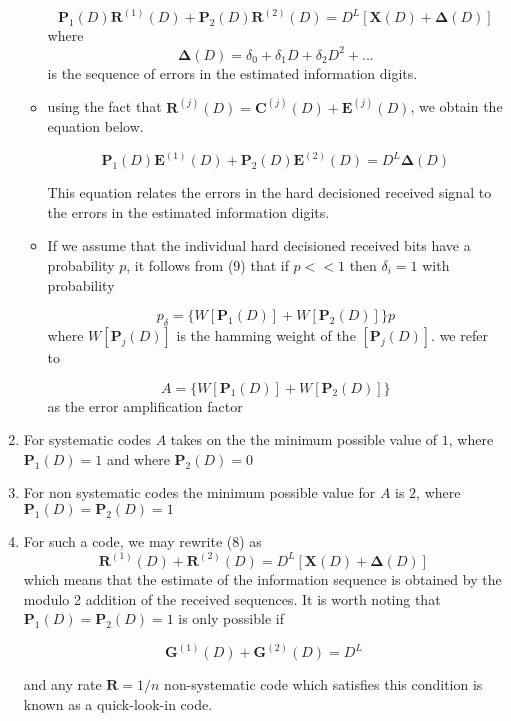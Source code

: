 \documentclass[fontsize=12pt]{article}
\begin{document}
\begin{enumerate}
\begin{itemize}
\begin{equation}
\mathbf{P}_1(D)\mathbf{R}^{(1)}(D) +\mathbf{P}_2(D)\mathbf{R}^{(2)}(D)= D^L[\mathbf{X}(D)+\mathbf{\Delta}(D)]
\end{equation}
where $$\mathbf{\Delta}(D)=\delta_0 +\delta_1D + \delta_2D^2+...$$ is the sequence of errors in the estimated information digits.

\item using the fact that $\mathbf{\mathbf{R}}^{(j)}(D)=\mathbf{C}^{(j)}(D)+\mathbf{\mathbf{E}}^{(j)}(D)$, we obtain the equation below.

\begin{equation}
\mathbf{P}_1(D)\mathbf{E}^{(1)}(D) +\mathbf{P}_2(D)\mathbf{E}^{(2)}(D)= D^L\mathbf{\Delta}(D)
\end{equation}

This equation relates the errors in the hard decisioned received signal to the errors in the estimated information digits.

\item If we assume that the individual hard decisioned received bits have a probability $p$, it follows from (9) that  if $p<<1$ then $\delta_i=1$ with probability 

\begin{equation}
p_{\delta} = \{W[\mathbf{P}_1(D)]+W[\mathbf{P}_2(D)]\}p
\end{equation}
where $W[\mathbf{P}_j(D)]$ is the hamming weight of the $[\mathbf{P}_j(D)]$. we refer to 

$$ A=\{W[\mathbf{P}_1(D)]+W[\mathbf{P}_2(D)]\}$$ as the error amplification factor
\end{itemize}

\item For systematic codes $A$ takes on the the minimum possible value of $1$, where $\mathbf{P}_1(D)=1$ and where $\mathbf{P}_2(D)=0$

\item For non systematic codes the minimum possible value for $A$ is $2$, where $\mathbf{P}_1(D)=\mathbf{P}_2(D)=1$

\item For such a code, we may rewrite (8) as 
\begin{equation}
\mathbf{R}^{(1)}(D) + \mathbf{R}^{(2)}(D)= D^L[\mathbf{X}(D)+\mathbf{\Delta}(D)]
\end{equation}
which means that the estimate of the information sequence is obtained by the modulo 2 addition of the received sequences. It is worth noting that  $\mathbf{P}_1(D)=\mathbf{P}_2(D)=1$ is only possible if 

\begin{equation}
\mathbf{G}^{(1)}(D)+\mathbf{G}^{(2)}(D)=D^L
\end{equation}

and any rate $\mathbf{R}=1/n$ non-systematic code which satisfies this condition is known as a quick-look-in code.


\end{enumerate}
\end{document}
